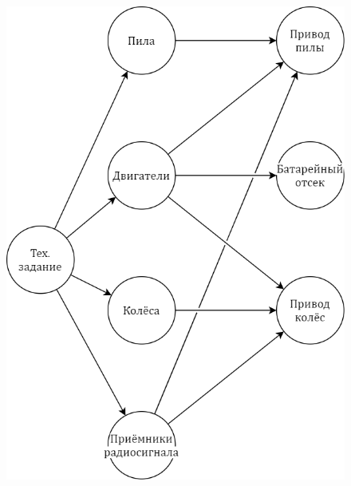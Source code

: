 \begin{frame}[t]
\begin{figure}[!ht]
{		\includegraphics[scale=0.17]{images/design.frame03.png}
		}
\end{figure}
\end{frame}
